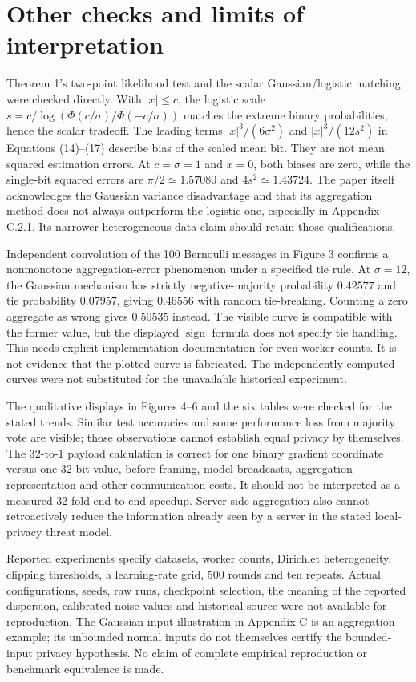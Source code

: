 \documentclass[10pt]{article}
\begin{document}
\section*{Other checks and limits of interpretation}
Theorem 1’s two-point likelihood test and the scalar Gaussian/logistic matching were checked directly. With \(|x|\le c\), the logistic scale \(s=c/\log(\Phi(c/\sigma)/\Phi(-c/\sigma))\) matches the extreme binary probabilities, hence the scalar tradeoff. The leading terms \(|x|^3/(6\sigma^2)\) and \(|x|^3/(12s^2)\) in Equations (14)–(17) describe bias of the scaled mean bit. They are not mean squared estimation errors. At \(c=\sigma=1\) and \(x=0\), both biases are zero, while the single-bit squared errors are \(\pi/2\simeq1.57080\) and \(4s^2\simeq1.43724\). The paper itself acknowledges the Gaussian variance disadvantage and that its aggregation method does not always outperform the logistic one, especially in Appendix C.2.1. Its narrower heterogeneous-data claim should retain those qualifications.\par
Independent convolution of the 100 Bernoulli messages in Figure 3 confirms a nonmonotone aggregation-error phenomenon under a specified tie rule. At \(\sigma=12\), the Gaussian mechanism has strictly negative-majority probability \(0.42577\) and tie probability \(0.07957\), giving \(0.46556\) with random tie-breaking. Counting a zero aggregate as wrong gives \(0.50535\) instead. The visible curve is compatible with the former value, but the displayed \(\operatorname{sign}\) formula does not specify tie handling. This needs explicit implementation documentation for even worker counts. It is not evidence that the plotted curve is fabricated. The independently computed curves were not substituted for the unavailable historical experiment.\par
The qualitative displays in Figures 4–6 and the six tables were checked for the stated trends. Similar test accuracies and some performance loss from majority vote are visible; those observations cannot establish equal privacy by themselves. The 32-to-1 payload calculation is correct for one binary gradient coordinate versus one 32-bit value, before framing, model broadcasts, aggregation representation and other communication costs. It should not be interpreted as a measured 32-fold end-to-end speedup. Server-side aggregation also cannot retroactively reduce the information already seen by a server in the stated local-privacy threat model.\par
Reported experiments specify datasets, worker counts, Dirichlet heterogeneity, clipping thresholds, a learning-rate grid, 500 rounds and ten repeats. Actual configurations, seeds, raw runs, checkpoint selection, the meaning of the reported dispersion, calibrated noise values and historical source were not available for reproduction. The Gaussian-input illustration in Appendix C is an aggregation example; its unbounded normal inputs do not themselves certify the bounded-input privacy hypothesis. No claim of complete empirical reproduction or benchmark equivalence is made.\par
\end{document}
